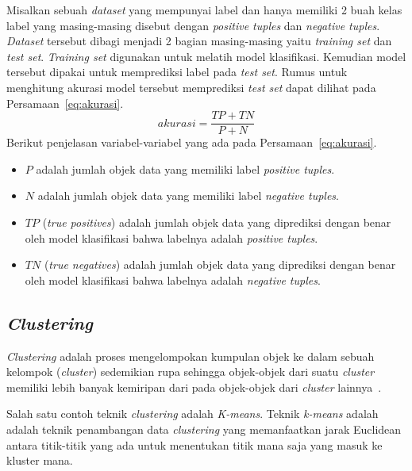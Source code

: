 Misalkan sebuah \textit{dataset} yang mempunyai label dan hanya memiliki 2 buah kelas label yang masing-masing disebut dengan \textit{positive tuples} dan \textit{negative tuples}. \textit{Dataset} tersebut dibagi menjadi 2 bagian masing-masing yaitu \textit{training set} dan \textit{test set}. \textit{Training set} digunakan untuk melatih model klasifikasi. Kemudian model tersebut dipakai untuk memprediksi label pada \textit{test set}. Rumus untuk menghitung akurasi model tersebut memprediksi \textit{test set} dapat dilihat pada Persamaan~\ref{eq:akurasi}.
\begin{equation}\label{eq:akurasi}
	akurasi=\frac{TP+TN}{P+N}
\end{equation}
Berikut penjelasan variabel-variabel yang ada pada Persamaan~\ref{eq:akurasi}.
\begin{itemize}
	\item \(P\) adalah jumlah objek data yang memiliki label \textit{positive tuples}.
	\item \(N\) adalah jumlah objek data yang memiliki label \textit{negative tuples}.
	\item \(TP\) (\textit{true positives}) adalah jumlah objek data yang diprediksi dengan benar oleh model klasifikasi bahwa labelnya adalah \textit{positive tuples}.
	\item \(TN\) (\textit{true negatives}) adalah jumlah objek data yang diprediksi dengan benar oleh model klasifikasi bahwa labelnya adalah \textit{negative tuples}.
\end{itemize}

\subsection{\textit{Clustering}}
\label{subsec:clustering}

\textit{Clustering} adalah proses mengelompokan kumpulan objek ke dalam sebuah kelompok (\textit{cluster}) sedemikian rupa sehingga objek-objek dari suatu \textit{cluster} memiliki lebih banyak kemiripan dari pada objek-objek dari \textit{cluster} lainnya~\cite{mendes:17:ppdmieee}. 

Salah satu contoh teknik \textit{clustering} adalah \textit{K-means}. Teknik \textit{k-means} adalah adalah teknik penambangan data \textit{clustering} yang memanfaatkan jarak Euclidean antara titik-titik yang ada untuk menentukan titik mana saja yang masuk ke kluster mana.

